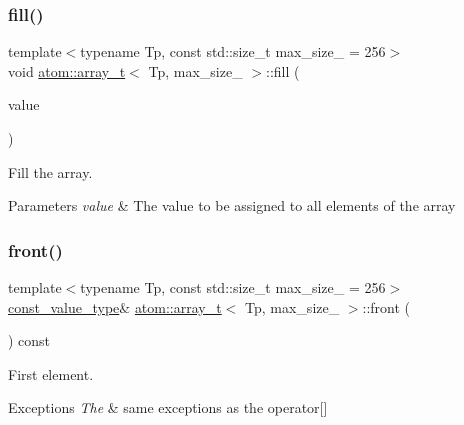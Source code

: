 \subsubsection{\texorpdfstring{fill()}{fill()}}
{\footnotesize\ttfamily template$<$typename Tp, const std\+::size\+\_\+t max\+\_\+size\+\_\+ = 256$>$ \\
void \hyperlink{classatom_1_1array__t}{atom\+::array\+\_\+t}$<$ Tp, max\+\_\+size\+\_\+ $>$\+::fill (\begin{DoxyParamCaption}\item[{\hyperlink{classatom_1_1array__t_a9c33ee3fb4e5b4d57c7801a8f69ada14}{const\+\_\+value\+\_\+type} \&}]{value }\end{DoxyParamCaption})\hspace{0.3cm}{\ttfamily [inline]}}



Fill the array. 


\begin{DoxyParams}{Parameters}
{\em value} & The value to be assigned to all elements of the array \\
\hline
\end{DoxyParams}
\mbox{\label{classatom_1_1array__t_a3ef0f195a147615aa53a3e2a47c61c49}} 
\subsubsection{\texorpdfstring{front()}{front()}}
{\footnotesize\ttfamily template$<$typename Tp, const std\+::size\+\_\+t max\+\_\+size\+\_\+ = 256$>$ \\
\hyperlink{classatom_1_1array__t_a9c33ee3fb4e5b4d57c7801a8f69ada14}{const\+\_\+value\+\_\+type}\& \hyperlink{classatom_1_1array__t}{atom\+::array\+\_\+t}$<$ Tp, max\+\_\+size\+\_\+ $>$\+::front (\begin{DoxyParamCaption}{ }\end{DoxyParamCaption}) const\hspace{0.3cm}{\ttfamily [inline]}}



First element. 


\begin{DoxyExceptions}{Exceptions}
{\em The} & same exceptions as the operator\mbox{[}\mbox{]} \\
\hline
\end{DoxyExceptions}
\mbox{\label{classatom_1_1array__t_a6a069628b26cc592466475ec97ff362a}} 
